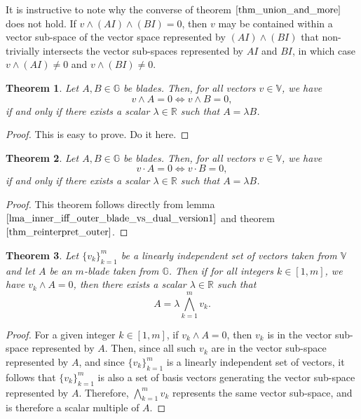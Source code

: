 \documentclass{article}
\newcommand{\R}{\mathbb{R}}
\newcommand{\V}{\mathbb{V}}
\newcommand{\G}{\mathbb{G}}
\newtheorem{theorem}{Theorem}[section]
\begin{document}
It is instructive to note why the converse of theorem $\eqref{thm_union_and_more}$ does not hold.
If $v\wedge(AI)\wedge(BI)=0$, then $v$ may be contained within a vector sub-space of the vector
space represented by $(AI)\wedge(BI)$ that non-trivially intersects the vector sub-spaces represented
by $AI$ and $BI$, in which case $v\wedge(AI)\neq 0$ and $v\wedge(BI)\neq 0$.

\begin{theorem}\label{thm_reinterpret_outer}
Let $A,B\in\G$ be blades.  Then, for all vectors $v\in\V$, we have
\begin{equation*}
v\wedge A=0 \iff v\wedge B=0,
\end{equation*}
if and only if there exists a scalar $\lambda\in\R$ such that $A=\lambda B$.
\end{theorem}
\begin{proof}
This is easy to prove.  Do it here.
\end{proof}

\begin{theorem}\label{thm_reinterpert_inner}
Let $A,B\in\G$ be blades.  Then, for all vectors $v\in\V$, we have
\begin{equation*}
v\cdot A=0 \iff v\cdot B=0,
\end{equation*}
if and only if there exists a scalar $\lambda\in\R$ such that $A=\lambda B$.
\end{theorem}
\begin{proof}
This theorem follows directly from lemma $\eqref{lma_inner_iff_outer_blade_vs_dual_version1}$
and theorem $\eqref{thm_reinterpret_outer}$.
\end{proof}

\begin{theorem}\label{thm_basis_for_blade}
Let $\{v_k\}_{k=1}^m$ be a linearly independent set of vectors taken from $\V$ and
let $A$ be an $m$-blade taken from $\G$.
Then if for all integers $k\in[1,m]$, we have $v_k\wedge A=0$, then there
exists a scalar $\lambda\in\R$ such that
\begin{equation*}
A = \lambda\bigwedge_{k=1}^m v_k.
\end{equation*}
\end{theorem}
\begin{proof}
For a given integer $k\in[1,m]$, if $v_k\wedge A=0$, then $v_k$ is in the
vector sub-space represented by $A$.  Then, since all such $v_k$ are in the
vector sub-space represented by $A$, and since $\{v_k\}_{k=1}^m$ is a
linearly independent set of vectors, it follows that $\{v_k\}_{k=1}^m$
is also a set of basis vectors generating the vector sub-space represented by $A$.
Therefore, $\bigwedge_{k=1}^m v_k$ represents the same vector sub-space, and is
therefore a scalar multiple of $A$.
\end{proof}
\end{document}
